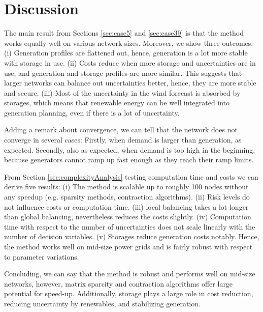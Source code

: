 \documentclass[final,3p,times,twocolumn]{elsarticle}  %
\newcommand{\todo}[1]{\textcolor{orange}{[#1]}}
\begin{document}
\section{Discussion}
\label{sec:discussion}

The main result from Sections \ref{sec:case5} and \ref{sec:case39} is that the method works equally well on various network sizes.
Moreover, we show three outcomes:
(i) Generation profiles are flattened out, hence, generation is a lot more stable with storage in use.
(ii) Costs reduce when more storage and uncertainties are in use, and generation and storage profiles are more similar. This suggests that larger networks can balance out uncertainties better, hence, they are more stable and secure.
(iii) Most of the uncertainty in the wind forecast is absorbed by storages, which means that renewable energy can be well integrated into generation planning, even if there is a lot of uncertainty.

Adding a remark about convergence, we can tell that the network does not converge in several cases: Firstly, when demand is larger than generation, as expected. Secondly, also as expected, when demand is too high in the beginning, because generators cannot ramp up fast enough as they reach their ramp limits.

From Section \ref{sec:complexityAnalysis} testing computation time and costs we can derive five results:
(i) The method is scalable up to roughly 100 nodes without any speedup (e.g. sparsity methods, contraction algorithms).
(ii) Risk levels do not influence costs or computation time.
(iii) local balancing takes a lot longer than global balancing, nevertheless reduces the costs slightly.
(iv) Computation time with respect to the number of uncertainties does not scale linearly with the number of decision variables. 
(v) Storages reduce generation costs notably.
Hence, the method works well on mid-size power grids and is fairly robust with respect to parameter variations. 

Concluding, we can say that the method is robust and performs well on mid-size networks, however, matrix sparcity and contraction algorithms offer large potential for speed-up. Additionally, storage plays a large role in cost reduction, reducing uncertainty by renewables, and stabilizing generation.
\end{document}
